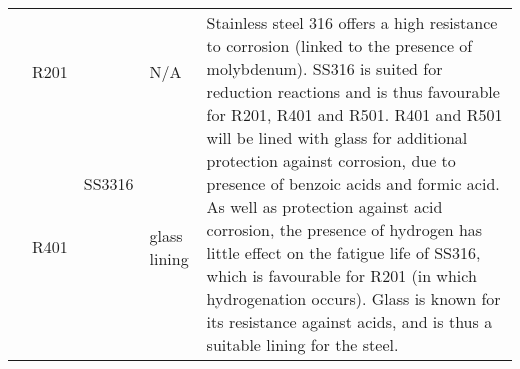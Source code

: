 {\begin{tabular}{@{}lp{5cm}p{2cm}p{2cm}p{12cm}@{}}
                                                      & R201                                                   & \multirow[t]{3}{=}{SS3316}                                                                & N/A                                               & \multirow[t]{3}{=}{Stainless steel 316 offers a high resistance to corrosion (linked to the presence of molybdenum). SS316 is suited for reduction reactions and is thus favourable for R201, R401 and R501. R401 and R501 will be lined with glass for additional protection against corrosion, due to presence of benzoic acids and formic acid. As well as protection against acid corrosion, the presence of hydrogen has little effect on the fatigue life of SS316, which is favourable for R201 (in which hydrogenation occurs). Glass is known for its resistance against acids, and is thus a suitable lining for the steel.}                                                                                                                                                                                                                                                                               \\ \cmidrule(l){2-2} \cmidrule(l){4-4}
                                                      & R401                                                   &                                                                                        & glass lining                                      &                                                                                                                                                                                                                                                                                                                                                                                                                                                                                                                                                                                                                                                                                                                                                                                                                                                                                                                    \\ \cmidrule(l){2-2} \cmidrule(l){4-4}

\end{tabular}}
